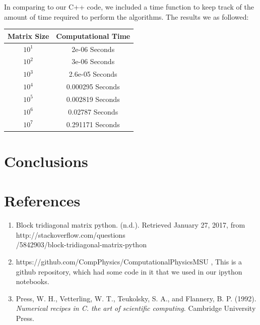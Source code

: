 \documentclass{article}
\begin{document}
In comparing to our C++ code, we included a time function to keep track of the amount of time required to perform the algorithms. The results we as followed:

\begin{center}
	\begin{tabular}{|c|c|}
		\hline
		Matrix Size & Computational Time\\
		\hline
		$10^{1}$ &2e-06 Seconds\\
		\hline
		$10^{2}$ &3e-06 Seconds\\
		\hline
		$10^{3}$ & 2.6e-05 Seconds\\
		\hline
		$10^{4}$ & 0.000295 Seconds\\
		\hline
		$10^{5}$ & 0.002819 Seconds\\
		\hline
		$10^{6}$ & 0.02787 Seconds\\
		\hline
		$10^{7}$ & 0.291171 Seconds\\
		\hline
		
	\end{tabular}
\end{center}
\newpage
\section{Conclusions}


\section{References}
\begin{enumerate}
	\item  Block tridiagonal matrix python. (n.d.). Retrieved January 27, 2017, from http://stackoverflow.com/questions\\/5842903/block-tridiagonal-matrix-python
	
	\item https://github.com/CompPhysics/ComputationalPhysicsMSU , This is a github repository, which had some code in it that we used in our ipython notebooks.
	
	
	
	\item Press, W. H., Vetterling, W. T., Teukolsky, S. A., and Flannery, B. P. (1992). \textit{Numerical recipes in C. the art of scientific computing}. Cambridge University Press.
\end{enumerate}
\end{document}
